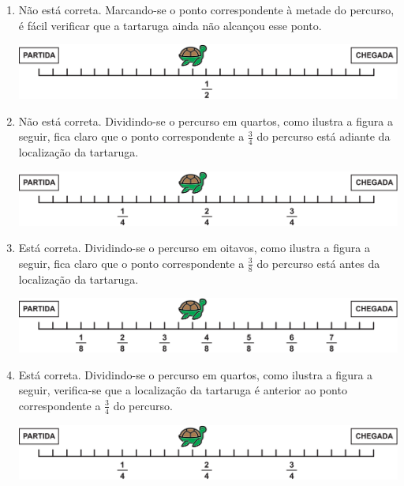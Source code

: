 \documentclass[10 pt,usenames,dvipsnames, oneside]{article}
\begin{document}
\ifdefined\prof
\begin{solucao}

\begin{enumerate}
\item Não está correta. Marcando-se o ponto correspondente à metade do percurso, é fácil verificar que a tartaruga ainda não alcançou esse ponto. 
\begin{center} \includegraphics[width=390pt,keepaspectratio]{ativ9_resp_a}
\end{center}
\item  Não está correta. Dividindo-se o percurso em quartos, como ilustra a figura a seguir, fica claro que o ponto correspondente a     $\frac{3}{4}$     do percurso está adiante da localização da tartaruga.
\begin{center}
\includegraphics[width=390pt, keepaspectratio]{ativ9_resp_b}
\end{center}
\item     Está correta. Dividindo-se o percurso em oitavos, como ilustra a figura a seguir, fica claro que o ponto correspondente a     $\frac{3}{8}$     do percurso está antes da localização da tartaruga.
\begin{center} \includegraphics[width=390pt,keepaspectratio]{ativ9_resp_c} 
\end{center}
\item     Está correta. Dividindo-se o percurso em quartos, como ilustra a figura a seguir, verifica-se que a localização da tartaruga é anterior ao ponto correspondente a     $\frac{3}{4}$     do percurso.
\clearpage
\begin{center} \includegraphics[width=390pt, keepaspectratio]{ativ9_resp_d}
\end{center}


\end{enumerate}
\end{solucao}
\end{document}
